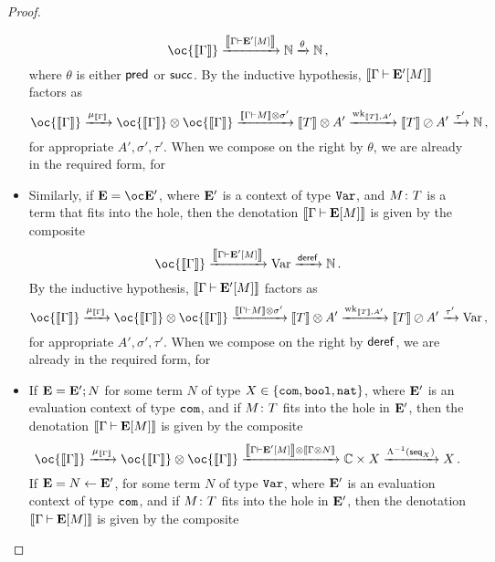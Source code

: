 \begin{proof}
\begin{itemize}
      \[
        \oc {\deno{\Gamma}} \xrightarrow{\deno{\Gamma \ts \EE'[M]}} \bN \xrightarrow{\theta} \bN\,,
        \]
      where $\theta$ is either $\operatorname{{\mathsf{pred}}}$ or $\operatorname{{\mathsf{succ}}}$.
      By the inductive hypothesis, $\left\llbracket\Gamma\mathbin{\vdash}{\mathbf{E}}'[M]\right\rrbracket$ factors as
      \[
        \oc{\deno{\Gamma}} \xrightarrow{\mu_{{\deno{\Gamma}}}} \oc {\deno{\Gamma}} \tensor \oc {\deno{\Gamma}} \xrightarrow{\deno{\Gamma\ts M}\tensor\sigma'} \deno{T}\tensor A' \xrightarrow{\wk_{\deno{T},A'}} \deno{T} \sequoid A' \xrightarrow{\tau'} \bN\,,
        \]
      for appropriate $A',\sigma',\tau'$.  
      When we compose on the right by $\theta$, we are already in the required form, for
    \item Similarly, if $\EE = \oc\EE'$, where ${\mathbf{E}}'$ is a context of type ${\mathtt{Var}}$, and $M\colon T$ is a term that fits into the hole, then the denotation $\left\llbracket\Gamma\mathbin{\vdash}{\mathbf{E}}[M]\right\rrbracket$ is given by the composite
      \[
        \oc {\deno{\Gamma}} \xrightarrow{\deno{\Gamma \ts \EE'[M]}} \Varr \xrightarrow{\dereff} \bN\,.
        \]
      By the inductive hypothesis, $\left\llbracket\Gamma\mathbin{\vdash}{\mathbf{E}}'[M]\right\rrbracket$ factors as
      \[
        \oc{\deno{\Gamma}} \xrightarrow{\mu_{{\deno{\Gamma}}}} \oc {\deno{\Gamma}} \tensor \oc {\deno{\Gamma}} \xrightarrow{\deno{\Gamma\ts M}\tensor\sigma'} \deno{T}\tensor A' \xrightarrow{\wk_{\deno{T},A'}} \deno{T} \sequoid A' \xrightarrow{\tau'} \Varr\,,
        \]
      for appropriate $A',\sigma',\tau'$.  
      When we compose on the right by $\operatorname{\mathsf{deref}}$, we are already in the required form, for
    \item If ${\mathbf{E}}={\mathbf{E}}';N$ for some term $N$ of type $X\in\{{\mathtt{com}},{\mathtt{bool}},{\mathtt{nat}}\}$, where ${\mathbf{E}}'$ is an evaluation context of type ${\mathtt{com}}$, and if $M\colon T$ fits into the hole in ${\mathbf{E}}'$, then the denotation $\left\llbracket\Gamma\mathbin{\vdash}{\mathbf{E}}[M]\right\rrbracket$ is given by the composite
      \[
        \oc{\deno{\Gamma}} \xrightarrow{\mu_{{\deno{\Gamma}}}} \oc{\deno{\Gamma}} \tensor \oc{\deno{\Gamma}} \xrightarrow{\deno{\Gamma\ts\EE'[M]}\tensor\deno{\Gamma\tensor N}} \bC \times X \xrightarrow{\Lambda\inv(\seq_X)} X\,.
        \]
      If ${\mathbf{E}} = N\gets{\mathbf{E}}'$, for some term $N$ of type ${\mathtt{Var}}$, where ${\mathbf{E}}'$ is an evaluation context of type ${\mathtt{com}}$, and if $M\colon T$ fits into the hole in ${\mathbf{E}}'$, then the denotation $\left\llbracket\Gamma\mathbin{\vdash}{\mathbf{E}}[M]\right\rrbracket$ is given by the composite

\end{itemize}
\end{proof}
